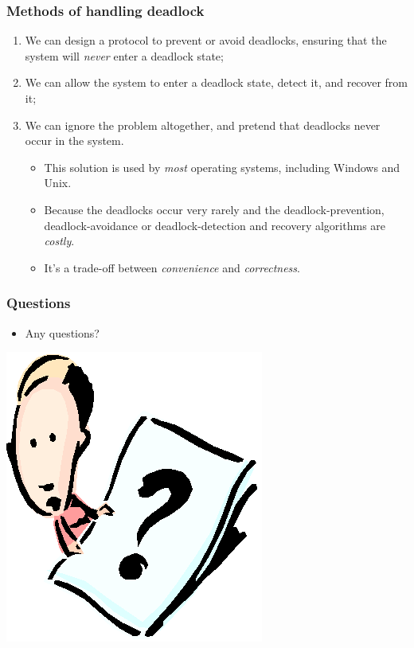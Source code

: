 \documentclass[CJKutf8,xcolor=pdftex,dvipsnames,table]{beamer}
\begin{document}
\begin{CJK*}{UTF8}{song}
  \begin{frame}
  \frametitle{Methods of handling deadlock} \pause
  \begin{enumerate}
  \item{We can design a protocol to prevent or avoid deadlocks, ensuring that the system will \emph{never} enter a deadlock state;} \pause
  \item{We can allow the system to enter a deadlock state, detect it, and recover from it;} \pause
  \item{We can ignore the problem altogether, and pretend that deadlocks never occur in the system.} \pause
    \begin{itemize}
    \item{This solution is used by \emph{most} operating systems, including Windows and Unix.} \pause
    \item{Because the deadlocks occur very rarely and the deadlock-prevention, deadlock-avoidance or deadlock-detection and recovery algorithms are \emph{costly}.} \pause
    \item{It's a trade-off between \emph{convenience} and \emph{correctness}.}
    \end{itemize}
  \end{enumerate}
  \end{frame}
  
  \begin{frame}
  \frametitle{Questions}
  \begin{itemize}
  \item{Any questions?}
  \end{itemize}
  \begin{center}
    \includegraphics[scale=.5]{question}
  \end{center}
  \end{frame}
  


\end{CJK*}
\end{document}
